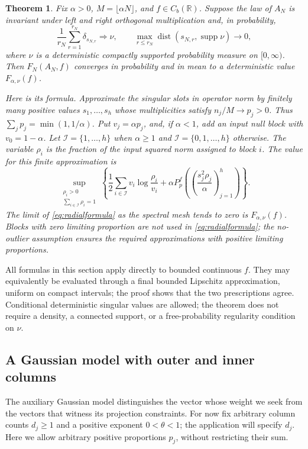 \documentclass[11pt]{article}
\numberwithin{equation}{section}
\newtheorem{theorem}{Theorem}[section]
\theoremstyle{definition}
\newcommand{\R}{\mathbb R}
\newcommand{\supp}{\operatorname{supp}}
\begin{document}
\begin{theorem}\label{thm:main}
Fix $\alpha>0$, $M=\lfloor\alpha N\rfloor$, and $f\in C_b(\R)$. Suppose the law of $A_N$ is invariant under left and right orthogonal multiplication and, in probability,
\begin{equation}\label{eq:spectralhyp}
\frac1{r_N}\sum_{r=1}^{r_N}\delta_{s_{N,r}}\Longrightarrow\nu,
\qquad
\max_{r\le r_N}\operatorname{dist}(s_{N,r},\supp\nu)\longrightarrow0,
\end{equation}
where $\nu$ is a deterministic compactly supported probability measure on $[0,\infty)$. Then $F_N(A_N,f)$ converges in probability and in mean to a deterministic value $F_{\alpha,\nu}(f)$.

\pagebreak[3]
Here is its formula. Approximate the singular slots in operator norm by finitely many positive values $s_1,\ldots,s_h$ whose multiplicities satisfy $n_j/M\to p_j>0$. Thus $\sum_jp_j=\min(1,1/\alpha)$. Put $v_j=\alpha p_j$, and, if $\alpha<1$, add an input null block with $v_0=1-\alpha$. Let $\mathcal I=\{1,\ldots,h\}$ when $\alpha\ge1$ and $\mathcal I=\{0,1,\ldots,h\}$ otherwise. The variable $\rho_i$ is the fraction of the input squared norm assigned to block $i$. The value for this finite approximation is
\begin{equation}\label{eq:radialformula}
\sup_{\substack{\rho_i>0\\\sum_{i\in\mathcal I}\rho_i=1}}
\left\{
\frac12\sum_{i\in\mathcal I}v_i\log\frac{\rho_i}{v_i}
+\alpha P_p^f\left(\left(\frac{s_j^2\rho_j}{\alpha}\right)_{j=1}^h\right)
\right\}.
\end{equation}
The limit of \eqref{eq:radialformula} as the spectral mesh tends to zero is $F_{\alpha,\nu}(f)$. Blocks with zero limiting proportion are not used in \eqref{eq:radialformula}; the no-outlier assumption ensures the required approximations with positive limiting proportions.
\end{theorem}

All formulas in this section apply directly to bounded continuous $f$. They may equivalently be evaluated through a final bounded Lipschitz approximation, uniform on compact intervals; the proof shows that the two prescriptions agree. Conditional deterministic singular values are allowed; the theorem does not require a density, a connected support, or a free-probability regularity condition on $\nu$.

\subsection{A Gaussian model with outer and inner columns}
\label{subsec:Gaussianmodel}
The auxiliary Gaussian model distinguishes the vector whose weight we seek from the vectors that witness its projection constraints. For now fix arbitrary column counts $d_j\ge1$ and a positive exponent $0<\theta<1$; the application will specify $d_j$. Here we allow arbitrary positive proportions $p_j$, without restricting their sum.
\end{document}
